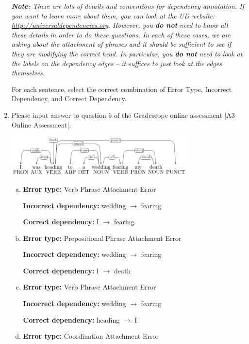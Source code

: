 \begin{enumerate}[1.]
{\em {\bf Note:}  There are lots of details and conventions for dependency annotation. If you want to learn more about them, you can look at the UD website: \url{http://universaldependencies.org}. However, you {\bf do not} need to know all these details in order to do these questions. In each of these cases, we are asking about the attachment of phrases and it should be sufficient to see if they are modifying the correct head. In particular, you {\bf do not} need to look at the labels on the dependency edges -- it suffices to just look at the edges themselves.}

For each sentence, select the correct combination of Error Type, Incorrect Dependency, and Correct Dependency.

\item {} Please input answer to question 6 of the Gradescope online assessment |A3 Online Assessment|.

\begin{center}
\includegraphics[width=0.75\textwidth]{6-1.png}
\end{center}

\begin{enumerate}[(a)]
\item {\bf Error type:} Verb Phrase Attachment Error

{\bf Incorrect dependency:} wedding $\rightarrow$ fearing

{\bf Correct dependency:} I $\rightarrow$ fearing

\item {\bf Error type:} Prepositional Phrase Attachment Error

{\bf Incorrect dependency:} wedding $\rightarrow$ fearing

{\bf Correct dependency:} I $\rightarrow$ death

\item {\bf Error type:} Verb Phrase Attachment Error

{\bf Incorrect dependency:} wedding $\rightarrow$ fearing

{\bf Correct dependency:} heading $\rightarrow$ I

\item {\bf Error type:} Coordination Attachment Error


\end{enumerate}
\end{enumerate}
